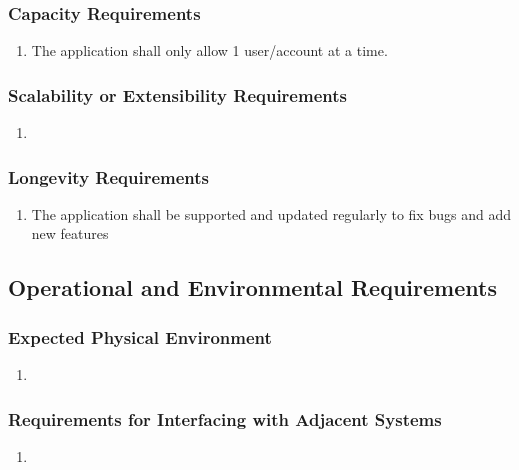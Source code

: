 \documentclass[]{article}
\begin{document}
\subsubsection{Capacity Requirements}
\label{ssub:capacity_requirements}
\begin{enumerate}[{PR}1. ]
	\item The application shall only allow 1 user/account at a time.
\end{enumerate}

\subsubsection{Scalability or Extensibility Requirements}
\label{ssub:scalability_or_extensibility_requirements}
\begin{enumerate}[{PR}1. ]
	\item
\end{enumerate}

\subsubsection{Longevity Requirements}
\label{ssub:longevity_requirements}
\begin{enumerate}[{PR}1. ]
	\item The application shall be supported and updated regularly to fix bugs and
add new features
\end{enumerate}


\subsection{Operational and Environmental Requirements}
\label{sub:operational_and_environmental_requirements}

\subsubsection{Expected Physical Environment}
\label{ssub:expected_physical_environment}
\begin{enumerate}[{OE}1. ]
	\item
\end{enumerate}

\subsubsection{Requirements for Interfacing with Adjacent Systems}
\label{ssub:requirements_for_interfacing_with_adjacent_systems}
\begin{enumerate}[{OE}1. ]
	\item
\end{enumerate}
\end{document}

